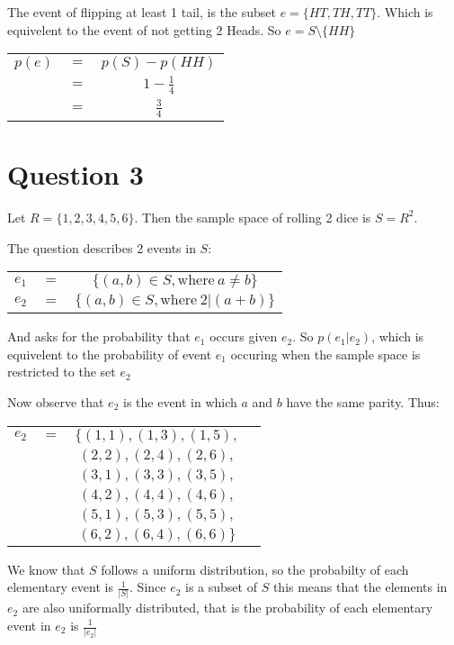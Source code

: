 \documentclass{article}
\numberwithin{equation}{subsection}
\begin{document}
	The event of flipping at least 1 tail, is the subset $e = \{HT, TH, TT\}$. Which is equivelent
	to the event of not getting 2 Heads. So $e =S \setminus \{HH\}$
	
	\begin{tabular}{c c c}
		$p(e)$	&	$=$	&	$p(S) - p(HH)$ \\
						&	$=$	&	$1-\frac{1}{4}$ \\
						&	$=$	&	$\frac{3}{4}$
	\end{tabular}

	\vspace{30pt}
	\section*{Question 3}
	Let $R = \{1,2,3,4,5,6\}$. Then the sample space of rolling 2 dice is $S = R^{2}$. 
	
	\vspace{5pt}
	The question describes 2 events in $S$:

	\begin{tabular}{c c c}
		$e_1$	&	$=$	&	$\{(a,b)\in S, \textrm{where}\ a \not= b\}$ \\
		$e_2$	&	$=$	&	$\{(a,b)\in S, \textrm{where}\ 2|(a+b)\}$
	\end{tabular}

	And asks for the probability that $e_1$ occurs given $e_2$. So $p(e_1|e_2)$, which
	is equivelent to the probability of event $e_1$ occuring when the sample space is restricted to the set $e_2$

	Now observe that $e_2$ is the event in which $a$ and $b$ have the same parity. Thus:
	
	\begin{tabular}{c c c c}
		$e_2$	&	$=$	&	$\{(1,1), (1,3), (1,5),$ 	\\
					& 		&		$(2,2), (2,4), (2,6),$	\\ 
					&			&		$(3,1), (3,3), (3,5),$	\\
					&			&		$(4,2), (4,4), (4,6),$	\\
					&			&		$(5,1), (5,3), (5,5),$	\\
					&			&		$(6,2), (6,4), (6,6)\}$	\\
	\end{tabular}

	We know that $S$ follows a uniform distribution, so the probabilty of each elementary event is $\frac{1}{|S|}$. Since $e_2$ is a
	subset of $S$ this means that the elements in $e_2$ are also uniformally distributed, that is the probability
	of each elementary event in $e_2$ is $\frac{1}{|e_2|}$
\end{document}
